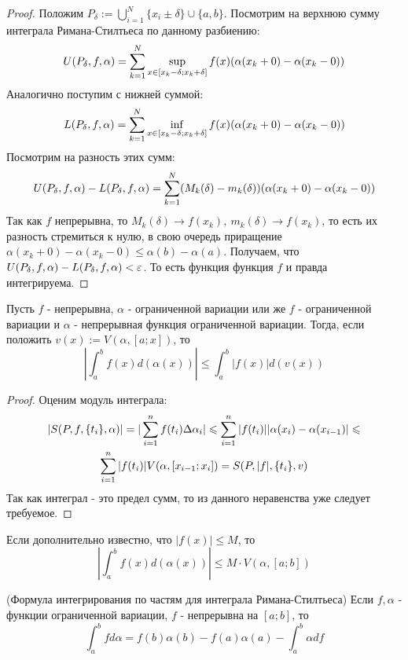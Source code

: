 \begin{proof}
	Положим $P_\delta := \bigcup\limits_{i = 1}^N \{x_i \pm \delta\} \cup \{a, b\}$. Посмотрим на верхнюю сумму интеграла Римана-Стилтьеса по данному разбиению:
	\[
		U(P_\delta, f, \alpha) = \sum\limits_{k = 1}^N \sup\limits_{x \in [x_k - \delta; x_k + \delta]} f(x) (\alpha(x_k + 0) - \alpha(x_k - 0))
	\]
	Аналогично поступим с нижней суммой:
	\[
		L(P_\delta, f, \alpha) = \sum\limits_{k = 1}^N \inf\limits_{x \in [x_k - \delta; x_k + \delta]} f(x) (\alpha(x_k + 0) - \alpha(x_k - 0))
	\]
	Посмотрим на разность этих сумм:
	\[
		U(P_\delta, f, \alpha) - L(P_\delta, f, \alpha) = \sum\limits_{k = 1}^N (M_k(\delta) - m_k(\delta)) (\alpha(x_k + 0) - \alpha(x_k - 0))
	\]
	Так как $f$ непрерывна, то $M_k(\delta) \to f(x_k),\ m_k(\delta) \to f(x_k)$, то есть их разность стремиться к нулю, в свою очередь приращение $\alpha(x_k + 0) - \alpha(x_k - 0) \leq \alpha(b) - \alpha(a)$.
	Получаем, что $U(P_\delta, f, \alpha) - L(P_\delta, f, \alpha) < \varepsilon$. То есть функция функция $f$ и правда интегрируема.
\end{proof}

\begin{theorem}
	Пусть $f$ - непрерывна, $\alpha$ - ограниченной вариации или же $f$ - ограниченной вариации и $\alpha$ - непрерывная функция ограниченной вариации. Тогда, если положить $v(x) := V(\alpha, [a; x])$, то
	\[
		\left|\int_a^b f(x) d(\alpha(x))\right| \le \int_a^b |f(x)| d(v(x))
	\]
\end{theorem}

\begin{proof}
	Оценим модуль интеграла:
	\begin{multline*}
		|S(P, f, \{t_i\}, \alpha)| = |\sum\limits_{i = 1}^n f(t_i) \Delta \alpha_i| \leqslant \sum\limits_{i = 1}^n |f(t_i)| |\alpha(x_i) - \alpha(x_{i - 1})| \leqslant
		\\
		\sum\limits_{i = 1}^n |f(t_i)| V(\alpha, [x_{i - 1}; x_i]) = S(P, |f|, \{t_i\}, v)
	\end{multline*}
	Так как интеграл - это предел сумм, то из данного неравенства уже следует требуемое.
\end{proof}

\begin{corollary}
	Если дополнительно известно, что $|f(x)| \le M$, то
	\[
		\left|\int_a^b f(x) d(\alpha(x))\right| \le M \cdot V(\alpha, [a; b])
	\]
\end{corollary}

\begin{theorem} (Формула интегрирования по частям для интеграла Римана-Стилтьеса)
	Если $f, \alpha$ - функции ограниченной вариации, $f$ - непрерывна на $[a; b]$, то
	\[
		\int_a^b f d\alpha = f(b)\alpha(b) - f(a)\alpha(a) - \int_a^b \alpha df
	\]
\end{theorem}

